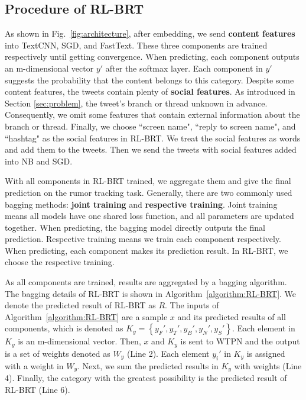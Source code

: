 \subsection{Procedure of RL-BRT}
As shown in Fig.~\ref{fig:architecture}, after embedding, we send \textbf{content features} into TextCNN, SGD, and FastText. These three components are trained respectively until getting convergence. When predicting, each component outputs an m-dimensional vector $y'$ after the softmax layer. Each component in $y'$ suggests the probability that the content belongs to this category. Despite some content features, the tweets contain plenty of \textbf{social features}. As introduced in Section \ref{sec:problem}, the tweet's branch or thread unknown in advance. Consequently, we omit some features that contain external information about the branch or thread. Finally, we choose ``screen name", ``reply to screen name", and ``hashtag" as the social features in RL-BRT. We treat the social features as words and add them to the tweets. Then we send the tweets with social features added into NB and SGD. 

With all components in RL-BRT trained, we aggregate them and give the final prediction on the rumor tracking task. Generally, there are two commonly used bagging methods: \textbf{joint training} and \textbf{respective training}. Joint training means all models have one shared loss function, and all parameters are updated together. When predicting, the bagging model directly outputs the final prediction. Respective training means we train each component respectively. When predicting, each component makes its prediction result. In RL-BRT, we choose the respective training. 

As all components are trained, results are aggregated by a bagging algorithm. The bagging details of RL-BRT is shown in Algorithm~\ref{algorithm:RL-BRT}. We denote the predicted result of RL-BRT as $R$. The inputs of Algorithm~\ref{algorithm:RL-BRT} are a sample $x$ and its predicted results of all components, which is denoted as $K_y = \left\{y_F', y_T', y_B', y_N', y_S' \right\}$. Each element in $K_y$ is an m-dimensional vector. Then, $x$ and $K_y$ is sent to WTPN and the output is a set of weights denoted as $W_y$ (Line 2). Each element $y_i'$ in $K_y$ is assigned with a weight in $W_y$. Next, we sum the predicted results in $K_y$ with weights (Line 4). Finally, the category with the greatest possibility is the predicted result of RL-BRT (Line 6). 

